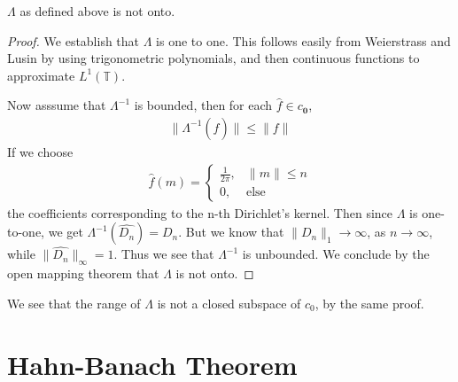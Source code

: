 \begin{theorem}
  $\Lambda$ as defined above is not onto.
\end{theorem}
\begin{proof}
  We establish that $\Lambda$ is one to one. This follows easily from
  Weierstrass and Lusin by using trigonometric polynomials, and then
  continuous functions to approximate $L^{1}(\mathbb{T})$.

  Now asssume that $\Lambda^{-1}$ is bounded, then for each $\hat{ f}
  \in c_{\textbf{0}}$,
  \begin{align*}
    \|\Lambda^{-1}(\hat{f})\| \le \|f\|
  \end{align*}
  If we choose
  \begin{align*}
    \hat{f}(m) =
    \begin{cases}
      \frac{1}{2\pi}, & \|m\| \le n \\
      0, & \textrm{else}
    \end{cases}
  \end{align*}
  the coefficients corresponding
  to the n-th Dirichlet's kernel. Then since $\Lambda$ is one-to-one,
  we get $\Lambda^{-1}(\hat{D_n}) = D_n$. But we know that $\|D_n\|_1
  \to \infty$, as $n \to \infty$, while $\|\hat{D_n}\|_\infty = 1$.
  Thus we see that $ \Lambda^{-1}$ is unbounded. We conclude by the
  open mapping theorem that $\Lambda$ is not onto.
\end{proof}
\begin{corollary}
  We see that the range of $\Lambda$ is not a closed subspace of
  $c_0$, by the same proof.
\end{corollary}

\section{Hahn-Banach Theorem}
